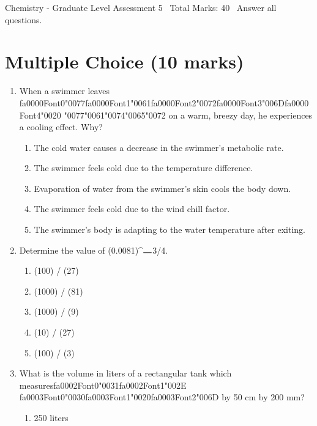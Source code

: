 \documentclass[12pt]{article}
\begin{document}
\begin{center}
Chemistry - Graduate Level Assessment 5 \
Total Marks: 40 \
Answer all questions.
\end{center}

\section*{Multiple Choice (10 marks)}
\begin{enumerate}[label=\arabic*.]
\item When a swimmer leaves {\csname fa0000Font0\endcsname\char"0077}{\csname fa0000Font1\endcsname\char"0061}{\csname fa0000Font2\endcsname\char"0072}{\csname fa0000Font3\endcsname\char"006D}{\csname fa0000Font4\endcsname\char"0020} {\char"0077}{\char"0061}{\char"0074}{\char"0065}{\char"0072} on a warm, breezy day, he experiences a cooling effect.
Why?
\begin{enumerate}[label=(\alph*)]
    \item The cold water causes a decrease in the swimmer's metabolic rate.
    \item The swimmer feels cold due to the temperature difference.
    \item Evaporation of water from the swimmer's skin cools the body down.
    \item The swimmer feels cold due to the wind chill factor.
    \item The swimmer's body is adapting to the water temperature after exiting.
\end{enumerate}
\item Determine the value of (0.0081)\^{}\ensuremath{\rule{1em}{1pt}}3/4.
\begin{enumerate}[label=(\alph*)]
    \item (100) / (27)
    \item (1000) / (81)
    \item (1000) / (9)
    \item (10) / (27)
    \item (100) / (3)
\end{enumerate}
\item What is the volume in liters of a rectangular tank which measures{\csname fa0002Font0\endcsname\char"0031}{\csname fa0002Font1\endcsname\char"002E} {\csname fa0003Font0\endcsname\char"0030}{\csname fa0003Font1\endcsname\char"0020}{\csname fa0003Font2\endcsname\char"006D} by 50 cm by 200 mm?
\begin{enumerate}[label=(\alph*)]
    \item 250 liters

\end{enumerate}
\end{enumerate}
\end{document}
